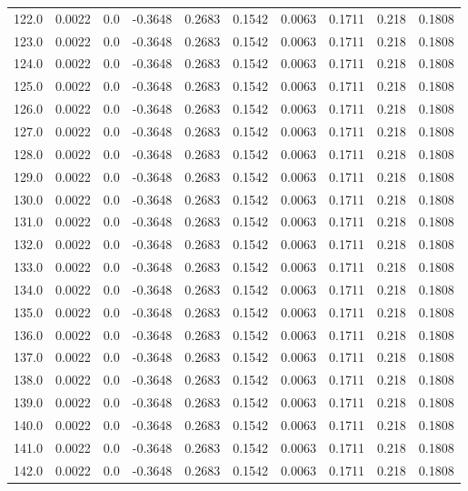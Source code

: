 \begin{longtable}{lrrrrrrrrr}
122.0 & 0.0022 & 0.0 & -0.3648 & 0.2683 & 0.1542 & 0.0063 & 0.1711 & 0.218 & 0.1808 \\
123.0 & 0.0022 & 0.0 & -0.3648 & 0.2683 & 0.1542 & 0.0063 & 0.1711 & 0.218 & 0.1808 \\
124.0 & 0.0022 & 0.0 & -0.3648 & 0.2683 & 0.1542 & 0.0063 & 0.1711 & 0.218 & 0.1808 \\
125.0 & 0.0022 & 0.0 & -0.3648 & 0.2683 & 0.1542 & 0.0063 & 0.1711 & 0.218 & 0.1808 \\
126.0 & 0.0022 & 0.0 & -0.3648 & 0.2683 & 0.1542 & 0.0063 & 0.1711 & 0.218 & 0.1808 \\
127.0 & 0.0022 & 0.0 & -0.3648 & 0.2683 & 0.1542 & 0.0063 & 0.1711 & 0.218 & 0.1808 \\
128.0 & 0.0022 & 0.0 & -0.3648 & 0.2683 & 0.1542 & 0.0063 & 0.1711 & 0.218 & 0.1808 \\
129.0 & 0.0022 & 0.0 & -0.3648 & 0.2683 & 0.1542 & 0.0063 & 0.1711 & 0.218 & 0.1808 \\
130.0 & 0.0022 & 0.0 & -0.3648 & 0.2683 & 0.1542 & 0.0063 & 0.1711 & 0.218 & 0.1808 \\
131.0 & 0.0022 & 0.0 & -0.3648 & 0.2683 & 0.1542 & 0.0063 & 0.1711 & 0.218 & 0.1808 \\
132.0 & 0.0022 & 0.0 & -0.3648 & 0.2683 & 0.1542 & 0.0063 & 0.1711 & 0.218 & 0.1808 \\
133.0 & 0.0022 & 0.0 & -0.3648 & 0.2683 & 0.1542 & 0.0063 & 0.1711 & 0.218 & 0.1808 \\
134.0 & 0.0022 & 0.0 & -0.3648 & 0.2683 & 0.1542 & 0.0063 & 0.1711 & 0.218 & 0.1808 \\
135.0 & 0.0022 & 0.0 & -0.3648 & 0.2683 & 0.1542 & 0.0063 & 0.1711 & 0.218 & 0.1808 \\
136.0 & 0.0022 & 0.0 & -0.3648 & 0.2683 & 0.1542 & 0.0063 & 0.1711 & 0.218 & 0.1808 \\
137.0 & 0.0022 & 0.0 & -0.3648 & 0.2683 & 0.1542 & 0.0063 & 0.1711 & 0.218 & 0.1808 \\
138.0 & 0.0022 & 0.0 & -0.3648 & 0.2683 & 0.1542 & 0.0063 & 0.1711 & 0.218 & 0.1808 \\
139.0 & 0.0022 & 0.0 & -0.3648 & 0.2683 & 0.1542 & 0.0063 & 0.1711 & 0.218 & 0.1808 \\
140.0 & 0.0022 & 0.0 & -0.3648 & 0.2683 & 0.1542 & 0.0063 & 0.1711 & 0.218 & 0.1808 \\
141.0 & 0.0022 & 0.0 & -0.3648 & 0.2683 & 0.1542 & 0.0063 & 0.1711 & 0.218 & 0.1808 \\
142.0 & 0.0022 & 0.0 & -0.3648 & 0.2683 & 0.1542 & 0.0063 & 0.1711 & 0.218 & 0.1808 \\

\end{longtable}
